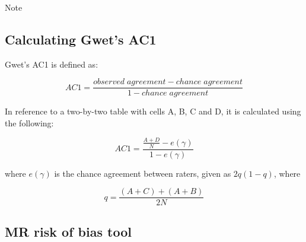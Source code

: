 \documentclass[a4paper, twoside]{templates/ociamthesis}
\begin{document}
Note

\hypertarget{calculating-gwets-ac1}{%
\subsection{Calculating Gwet's AC1}\label{calculating-gwets-ac1}}

Gwet's AC1 is defined as:

\[AC1 = \frac{observed\;agreement-chance\;agreement}{1-chance\;agreement}\]

In reference to a two-by-two table with cells A, B, C and D, it is calculated using the following:

\begin{equation}
  AC1 = \frac{\frac{A+D}{N}-e(\gamma)}{1-e(\gamma)}
  \label{eq:AC1-main}
\end{equation}

where \(e(\gamma)\) is the chance agreement between raters, given as \(2q(1-q)\), where

\begin{equation}
  q = \frac{(A+C)+(A+B)}{2N}
  \label{eq:AC1-supp}
\end{equation}

\hypertarget{appendix-mr-rob}{%
\subsection{MR risk of bias tool}\label{appendix-mr-rob}}
\end{document}
